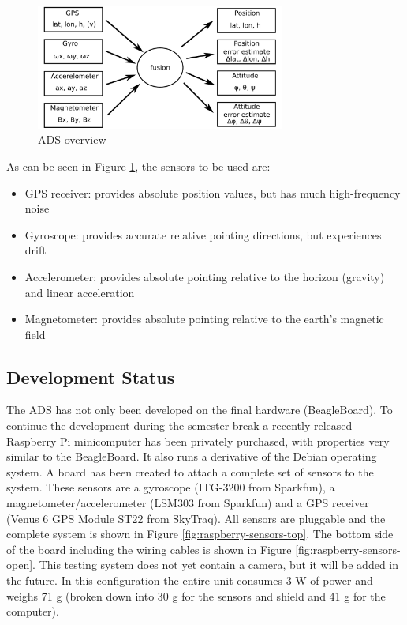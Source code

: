 \begin{figure}
\centering
\includegraphics[width=0.73\textwidth]{figures/ADS_diagram.pdf}
\caption{\ac{ADS} overview}
\label{fig:ADS_overview}
\end{figure}

\noindent
As can be seen in Figure \ref{fig:ADS_overview}, the sensors to be used are:

\begin{itemize}
\item \ac{GPS} receiver: provides absolute position values, but has much high-frequency noise
\item Gyroscope: provides accurate relative pointing directions, but experiences drift
\item Accelerometer: provides absolute pointing relative to the horizon (gravity) and linear acceleration
\item Magnetometer: provides absolute pointing relative to the earth's magnetic field
\end{itemize}

\subsection{Development Status}

The \ac{ADS} has not only been developed on the final hardware (BeagleBoard). To continue the development during the semester break a recently released Raspberry Pi minicomputer \cite{website:raspberry} has been privately purchased, with properties very similar to the BeagleBoard. It also runs a derivative of the Debian operating system. A board has been created to attach a complete set of sensors to the system. These sensors are a gyroscope (ITG-3200 from Sparkfun), a magnetometer/accelerometer (LSM303 from Sparkfun) and a \ac{GPS} receiver (Venus 6 \ac{GPS} Module ST22 from SkyTraq). All sensors are pluggable and the complete system is shown in Figure \ref{fig:raspberry-sensors-top}. The bottom side of the board including the wiring cables is shown in Figure \ref{fig:raspberry-sensors-open}. This testing system does not yet contain a camera, but it will be added in the future. In this configuration the entire unit consumes 3 W of power and weighs 71 g (broken down into 30 g for the sensors and shield and 41 g for the computer).


